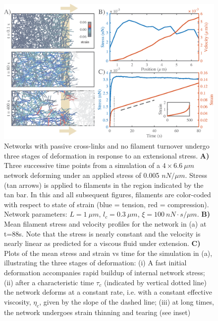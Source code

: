 \begin{figure}[h!]
	\centering
	\includegraphics[width=\hsize]{active/figures/Fig2}
	\caption{\label{fig:passive_ex}  Networks with passive cross-links and no filament turnover undergo three stages of deformation in response to an extensional stress.   \textbf{A)} Three successive time points from a simulation of a $4\times6.6\: \mu m$ network deforming under an applied stress of 0.005 $nN/\mu m$. Stress (tan arrows) is applied to filaments in the region indicated by the tan bar. In this and all subsequent figures, filaments are color-coded with respect to state of strain (blue = tension, red = compression).  Network parameters: $L=1\: \mu m$, $l_c=0.3\: \mu m$, $\xi=100\: nN\cdot s/\mu m$. \textbf{B)} Mean filament stress and velocity profiles for the  network in (a) at t=88s. Note that the stress is nearly constant and the velocity is nearly linear as predicted for a viscous fluid under extension.  \textbf{C)} Plots of the mean stress and strain vs time for the simulation in (a), illustrating the three stages of deformation: (i) A fast initial deformation accompanies rapid buildup of internal network stress; (ii) after a characteristic time $\tau_c$ (indicated by vertical dotted line) the network deforms at a constant rate, i.e. with a constant effective viscosity, $\eta_c$, given by the slope of the dashed line; (iii) at long times, the network undergoes strain thinning and tearing (see inset)}
\end{figure}

